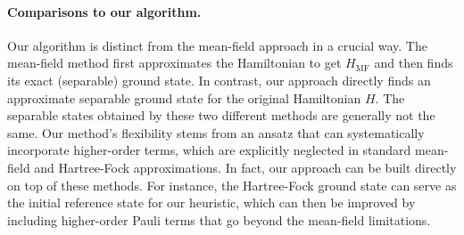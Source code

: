 \paragraph{Comparisons to our algorithm.} 
Our algorithm is distinct from the mean-field approach in a crucial way. The mean-field method first approximates the Hamiltonian to get $H_{\text{MF}}$ and then finds its exact (separable) ground state. In contrast, our approach directly finds an approximate separable ground state for the original Hamiltonian $H$. The separable states obtained by these two different methods are generally not the same. Our method's flexibility stems from an ansatz that can systematically incorporate higher-order terms, which are explicitly neglected in standard mean-field and Hartree-Fock approximations. In fact, our approach can be built directly on top of these methods. For instance, the Hartree-Fock ground state can serve as the initial reference state for our heuristic, which can then be improved by including higher-order Pauli terms that go beyond the mean-field limitations.

